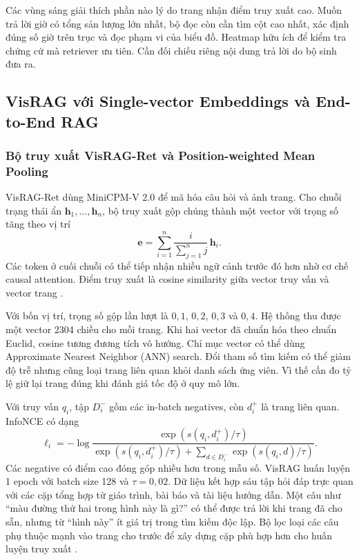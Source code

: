 Các vùng sáng giải thích phần nào lý do trang nhận điểm truy xuất cao. Muốn trả lời giờ có tổng sản lượng lớn nhất, bộ đọc còn cần tìm cột cao nhất, xác định đúng số giờ trên trục và đọc phạm vi của biểu đồ. Heatmap hữu ích để kiểm tra chứng cứ mà retriever ưu tiên. Cần đối chiếu riêng nội dung trả lời do bộ sinh đưa ra.

\subsection{VisRAG với Single-vector Embeddings và End-to-End RAG}
\label{subsec:visrag}

\subsubsection{Bộ truy xuất VisRAG-Ret và Position-weighted Mean Pooling}

VisRAG-Ret dùng MiniCPM-V 2.0 để mã hóa câu hỏi và ảnh trang. Cho chuỗi
trạng thái ẩn $\mathbf{h}_1,\ldots,\mathbf{h}_n$, bộ truy xuất gộp chúng
thành một vector với trọng số tăng theo vị trí
\begin{equation}
    \mathbf{e}=\sum_{i=1}^{n}\frac{i}{\sum_{j=1}^{n}j}\,\mathbf{h}_i.
\end{equation}
Các token ở cuối chuỗi có thể tiếp nhận nhiều ngữ cảnh trước đó hơn
nhờ cơ chế causal attention. Điểm truy xuất là cosine similarity
giữa vector truy vấn và vector trang \cite{yu2025visrag}.


Với bốn vị trí, trọng số gộp lần lượt là $0{,}1$, $0{,}2$, $0{,}3$
và $0{,}4$. Hệ thống thu được một vector 2304 chiều cho mỗi trang.
Khi hai vector đã chuẩn hóa theo chuẩn Euclid, cosine tương đương
tích vô hướng. Chỉ mục vector có thể dùng Approximate Nearest
Neighbor (ANN) search. Đổi tham số tìm kiếm có thể giảm độ trễ nhưng cũng
loại trang liên quan khỏi danh sách ứng viên. Vì thế cần đo tỷ lệ
giữ lại trang đúng khi đánh giá tốc độ ở quy mô lớn.

Với truy vấn $q_i$, tập $D_i^-$ gồm các in-batch negatives,
còn $d_i^+$ là trang liên quan. InfoNCE có dạng
\begin{equation}
    \ell_i=-\log
    \frac{\exp(s(q_i,d_i^+)/\tau)}
    {\exp(s(q_i,d_i^+)/\tau)+
      \sum_{d\in D_i^-}\exp(s(q_i,d)/\tau)}.
    \label{eq:tv2_visrag_loss}
\end{equation}
Các negative có điểm cao đóng góp nhiều hơn trong mẫu số.
VisRAG huấn luyện 1 epoch với batch size 128 và $\tau=0{,}02$. Dữ liệu
kết hợp sáu tập hỏi đáp trực quan với các cặp tổng hợp từ giáo
trình, bài báo và tài liệu hướng dẫn. Một câu như “màu đường
thứ hai trong hình này là gì?” có thể được trả lời khi trang đã
cho sẵn, nhưng từ “hình này” ít giá trị trong tìm kiếm độc lập.
Bộ lọc loại các câu phụ thuộc mạnh vào trang cho trước để xây
dựng cặp phù hợp hơn cho huấn luyện truy xuất \cite{yu2025visrag}.

